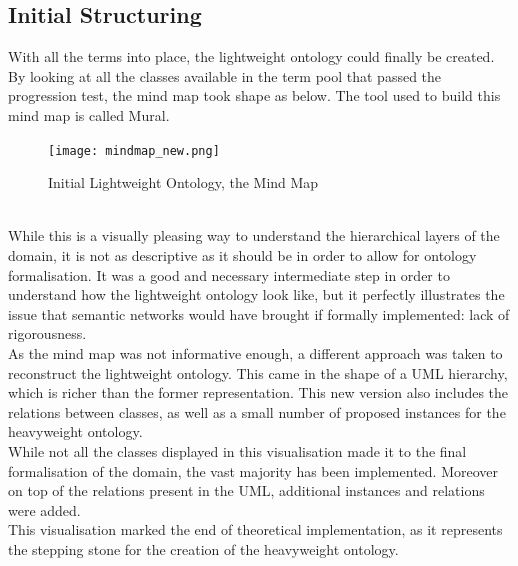 \documentclass[12pt]{report}
\begin{document}
	\subsection{Initial Structuring}
	With all the terms into place, the lightweight ontology could finally be created. By looking at all the classes available in the term pool that passed the progression test, the mind map took shape as below. The tool used to build this mind map is called Mural\cite{mural}.
	\begin{figure}[h!]
	    \centering
	    \texttt{[image: mindmap\_new.png]}
	    \caption{Initial Lightweight Ontology, the Mind Map}
	    \label{fig:mindmap}
	\end{figure}\\
	While this is a visually pleasing way to understand the hierarchical layers of the domain, it is not as descriptive as it should be in order to allow for ontology formalisation. It was a good and necessary intermediate step in order to understand how the lightweight ontology look like, but it perfectly illustrates the issue that semantic networks would have brought if formally implemented: lack of rigorousness.\\
	As the mind map was not informative enough, a different approach was taken to reconstruct the lightweight ontology. This came in the shape of a UML hierarchy, which is richer than the former representation. This new version also includes the relations between classes, as well as a small number of proposed instances for the heavyweight ontology.\\
	While not all the classes displayed in this visualisation made it to the final formalisation of the domain, the vast majority has been implemented. Moreover on top of the relations present in the UML, additional instances and relations were added.\\
	This visualisation marked the end of theoretical implementation, as it represents the stepping stone for the creation of the heavyweight ontology.
	
\end{document}
